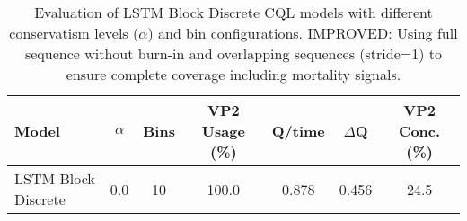 \begin{table}[ht]
\centering
\caption{Evaluation of LSTM Block Discrete CQL models with different conservatism levels ($\alpha$) and bin configurations. IMPROVED: Using full sequence without burn-in and overlapping sequences (stride=1) to ensure complete coverage including mortality signals.}
\label{tab:lstm_cql_evaluation_improved}
\begin{tabular}{lcccccc}
\toprule
Model & $\alpha$ & Bins & VP2 Usage (\%) & Q/time & $\Delta$Q & VP2 Conc. (\%) \\
\midrule
LSTM Block Discrete & 0.0 & 10 & 100.0 & 0.878 & 0.456 & 24.5 \\
\bottomrule
\end{tabular}
\end{table}